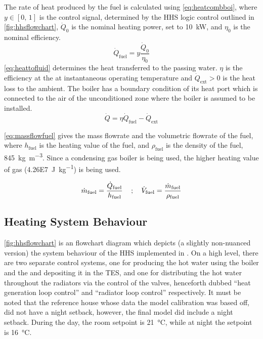 The rate of heat produced by the fuel is calculated using \cref{eq:heatcombboi}, where $y \in [0\text{, }1]$ is the control signal, determined by the \ac{HHS} logic control outlined in \cref{fig:hhsflowchart}, $\dot{Q}_0$ is the nominal heating power, set to \qty{10}{\kilo\watt}, and $\eta_0$ is the nominal efficiency.
\begin{equation}
    \dot{Q}_\text{fuel} = y \frac{\dot{Q}_0}{\eta_0}\label{eq:heatcombboi}
\end{equation}
\cref{eq:heattofluid} determines the heat transferred to the passing water. $\eta$ is the efficiency at the at instantaneous operating temperature and $\dot{Q}_\text{ext} > 0 $ is the heat loss to the ambient. The boiler has a boundary condition of its heat port which is connected to the air of the unconditioned zone where the boiler is assumed to be installed.  
\begin{equation}
    \dot{Q} = \eta \dot{Q}_\text{fuel} - \dot{Q}_\text{ext}\label{eq:heattofluid}
\end{equation}

\cref{eq:massflowfuel} gives the mass flowrate and the volumetric flowrate of the fuel, where $h_\text{fuel}$ is the heating value of the fuel, and $\rho_\text{fuel}$ is the density of the fuel, \qty{845}{\kilo\gram\per\cubic\meter}. Since a condensing gas boiler is being used, the higher heating value of gas (\qty{4.26E7}{\joule\per\kilo\gram}) is being used.

 \begin{equation}
    \dot{m}_\text{fuel} =\frac{\dot{Q}_\text{fuel}}{h_\text{fuel}}\label{eq:massflowfuel}\text{\;\;\; ; \;\;\;} \dot{V}_\text{fuel} =\frac{\dot{m}_\text{fuel}}{\rho_\text{fuel}}
 \end{equation}


\subsection{Heating System Behaviour}
\cref{fig:hhsflowchart} is an flowchart diagram which depicts (a slightly non-nuanced version) the system behaviour of the \ac{HHS} implemented in \modelica. 
On a high level, there are two separate control systems, one for producing the hot water using the boiler and the \HP and depositing it in the \ac{TES}, and one for distributing the hot water throughout the radiators via the control of the valves, henceforth dubbed ``heat generation loop control'' and ``radiator loop control'' respectively. It must be noted that the reference house whose data the model  calibration was based off, did not have a night setback, however, the final model did include a night setback. During the day, the room setpoint is \qty{21}{\celsius}, while at night the setpoint is \qty{16}{\celsius}.

